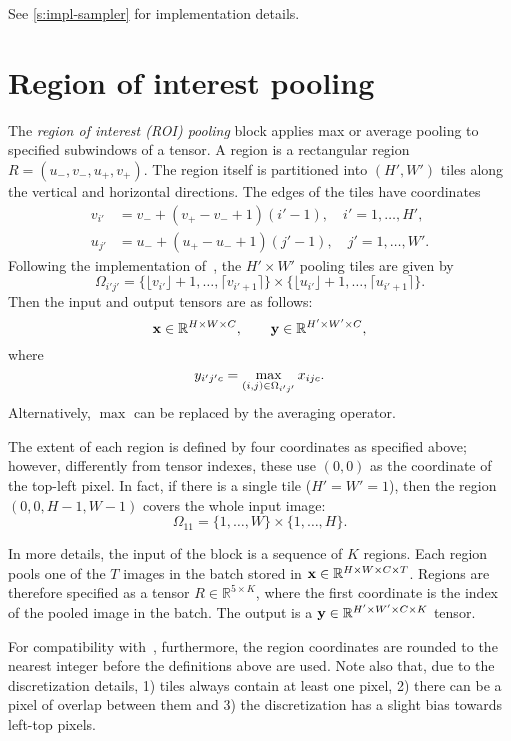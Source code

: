 See \cref{s:impl-sampler} for implementation details.

\section{Region of interest pooling}\label{s:roi-pooling}

The \emph{region of interest (ROI) pooling} block applies max or average pooling to specified subwindows of a tensor. A region is a rectangular region $R = (u_-,v_-,u_+,v_+)$. The region itself is partitioned into $(H',W')$ tiles along the vertical and horizontal directions. The edges of the tiles have coordinates
\begin{align*}
   v_{i'} &= v_- + (v_+ - v_- + 1) (i' - 1), \quad i' = 1,\dots,H',\\
   u_{j'} &= u_- + (u_+ - u_- + 1) (j' - 1), \quad j' = 1,\dots,W'.
\end{align*}
Following the implementation of~\cite{girshick15fast}, the $H'\times W'$ pooling tiles are given by
\[
   \Omega_{i'j'} =
   \{\lfloor v_{i'} \rfloor + 1, \dots, \lceil v_{i'+1} \rceil\}
   \times
   \{\lfloor u_{i'} \rfloor + 1, \dots, \lceil u_{i'+1} \rceil\}.
\]
Then the input and output tensors are as follows:
\[
  \mathbf{x} \in \mathbb{R}^{H \times W \times C},
  \qquad
  \mathbf{y} \in \mathbb{R}^{H' \times W' \times C},
\]
where
\[
   y_{i'j'c} = \operatornamewithlimits{max}_{(i,j) \in \Omega_{i'j'}} x_{ijc}.
\]
Alternatively, $\max$ can be replaced by the averaging operator.

The extent of each region is defined by four coordinates as specified above; however, differently from tensor indexes, these use $(0,0)$ as the coordinate of the top-left pixel. In fact, if there is a single tile ($H'=W'=1$), then the region $(0,0,H-1,W-1)$ covers the whole input image:
\[
   \Omega_{11} =
   \{1, \dots, W\}
   \times
   \{1, \dots, H\}.
\]

In more details, the input of the block is a sequence of $K$ regions. Each region pools one of the $T$ images in the batch stored in $\mathbf{x} \in \mathbb{R}^{H\times W\times C\times T}$. Regions are therefore specified as a tensor $R \in \mathbb{R}^{5 \times K}$, where the first coordinate is the index of the pooled image in the batch. The output is a $\mathbf{y} \in \mathbb{R}^{H' \times W' \times C \times K}$ tensor.

For compatibility with~\cite{girshick15fast}, furthermore, the region coordinates are rounded to the nearest integer before the definitions above are used. Note also that, due to the discretization details, 1) tiles always contain at least one pixel, 2) there can be a pixel of overlap between them and 3) the discretization has a slight bias towards left-top pixels.


